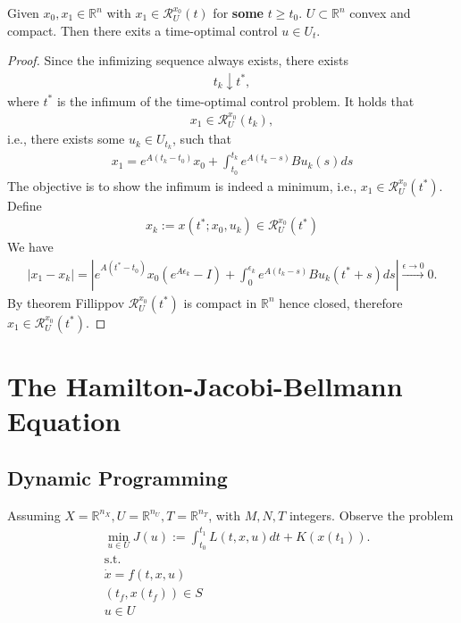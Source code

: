 \begin{theorem}
	Given $x_0, x_1 \in \mathbb{R}^n$ with $x_1 \in \mathcal{R}_U^{x_0}(t)$ for \textbf{some} $t \ge t_0$. $U \subset \mathbb{R}^n$ convex and compact. Then there exits a time-optimal control $u \in U_t$. 
\end{theorem}
\begin{proof}
	Since the infimizing sequence always exists, there exists 
	\begin{align*}
		t_k \downarrow t^*,
	\end{align*}
	where $t^*$ is the infimum of the time-optimal control problem. It holds that 
	\begin{align*}
		x_1 \in \mathcal{R}_U^{x_0}(t_k),
	\end{align*}
	i.e., there exists some $u_k \in U_{t_k}$, such that
	\begin{align*}
		x_1 = e^{A(t_k - t_0)}x_0 + \int_{t_0}^{t_k} e^{A(t_k - s)} Bu_k(s) ds 
	\end{align*}
	The objective is to show the infimum is indeed a minimum, i.e., $x_1 \in \mathcal{R}_U^{x_0}(t^*)$. Define
	\begin{align*}
		x_k:= x(t^*; x_0, u_k) \in \mathcal{R}_U^{x_0}(t^*)
	\end{align*}
	We have
	\begin{align*}
		|x_1 - x_k| = |e^{A(t^* - t_0)}x_0(e^{A \epsilon_k} - I) + \int_0^{\epsilon_k} e^{A(t_k - s)} Bu_k(t^* + s)ds| \overset{\epsilon \rightarrow 0 }{\longrightarrow} 0 .
	\end{align*}
	By theorem Fillippov $\mathcal{R}^{x_0}_U(t^*)$ is compact in $\mathbb{R}^n$ hence closed, therefore $x_1 \in \mathcal{R}_U^{x_0}(t^*)$. 
\end{proof}



\newpage
\section{The Hamilton-Jacobi-Bellmann Equation}
\subsection{Dynamic Programming}
Assuming $X = \mathbb{R}^{n_X}, U = \mathbb{R}^{n_U}, T = \mathbb{R}^{n_T}$, with $M, N, T$ integers. Observe the problem
\begin{align}
	\tag{$P_D$}\label{prob:PD}
	& \min_{u \in U} J(u):= \int_{t_0}^{t_1} L(t, x, u)dt + K(x(t_1)). \\
	&\text{s.t.}\\
	& \dot{x} = f(t, x, u)\\
	& (t_f, x(t_f)) \in S\\
	& u \in U
\end{align}

